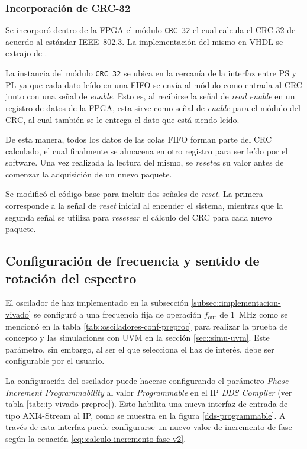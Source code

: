 \documentclass[../../main.tex]{subfiles}
\begin{document}
\subsubsection{Incorporación de CRC-32}
Se incorporó dentro de la FPGA el módulo \texttt{CRC 32} el cual calcula el CRC-32 de acuerdo al estándar IEEE~802.3. La implementación del mismo en VHDL se extrajo de \cite{crc-impl}.

La instancia del módulo \texttt{CRC 32} se ubica en la cercanía de la interfaz entre PS y PL ya que cada dato leído en una FIFO se envía al módulo como entrada al CRC junto con una señal de \textit{enable}. Esto es, al recibirse la señal de \textit{read enable} en un registro de datos de la FPGA, esta sirve como señal de \textit{enable} para el módulo del CRC, al cual también se le entrega el dato que está siendo leído.

De esta manera, todos los datos de las colas FIFO forman parte del CRC calculado, el cual finalmente se almacena en otro registro para ser leído por el software. Una vez realizada la lectura del mismo, se \textit{resetea} su valor antes de comenzar la adquisición de un nuevo paquete.

Se modificó el código base para incluir dos señales de \textit{reset}. La primera corresponde a la señal de \textit{reset} inicial al encender el sistema, mientras que la segunda señal se utiliza para \textit{resetear} el cálculo del CRC para cada nuevo paquete. 

\subsection{Configuración de frecuencia y sentido de rotación del espectro}\label{subsec::config-frec}
El oscilador de haz implementado en la subsección \ref{subsec::implementacion-vivado} se configuró a una frecuencia fija de operación $f_\textrm{out}$ de 1~MHz como se mencionó en la tabla \ref{tab::osciladores-conf-preproc} para realizar la prueba de concepto y las simulaciones con UVM en la sección \ref{sec::simu-uvm}. Este parámetro, sin embargo, al ser el que selecciona el haz de interés, debe ser configurable por el usuario.

La configuración del oscilador puede hacerse configurando el parámetro \textit{Phase Increment Programmability} al valor \textit{Programmable} en el IP \textit{DDS Compiler} (ver tabla \ref{tab::ip-vivado-preproc}). Esto habilita una nueva interfaz de entrada de tipo AXI4-Stream al IP, como se muestra en la figura \ref{dds-programmable}. A través de esta interfaz puede configurarse un nuevo valor de incremento de fase según la ecuación \ref{eq::calculo-incremento-fase-v2}.
\end{document}
